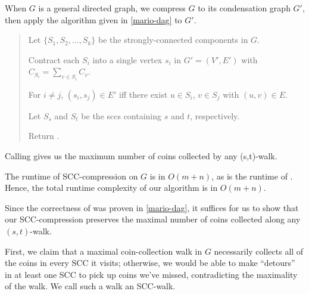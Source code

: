 \documentclass{article}
\begin{document}
\begin{solution}
When \( G \) is a general directed graph, we compress \( G \) to its condensation graph \( G' \), then apply the algorithm given in \ref{mario-dag} to \( G' \).

\begin{quote}%



\begin{steps}
    \item Let \( \{S_1, S_2, ..., S_k\} \) be the strongly-connected components in \( G \).
    \item Contract each \( S_i \) into a single vertex \( s_i \) in \( G' = (V', E') \) with \( C_{S_i} = \sum_{ v\in S_i} C_v \).
    \item For \( i \not= j \), \( (s_i, s_j) \in E' \) iff there exist \( u \in S_i \), \( v \in S_j \) with \( (u,v) \in E \).
    \item Let \( S_s \) and \( S_t \) be the sccs containing \( s \) and \( t \), respectively.
    \item Return .
\end{steps}
\end{quote}

Calling  gives us the maximum number of coins collected by any (s,t)-walk.


\begin{subproof}[Runtime]
The runtime of SCC-compression on \( G \) is in \( O(m+n) \), as is the runtime of . Hence, the total runtime complexity of our algorithm is in \( O(m+n) \).
\end{subproof}


\begin{subproof}[Correctness]
Since the correctness of  was proven in \ref{mario-dag}, it suffices for us to show that our SCC-compression preserves the maximal number of coins collected along any \( (s,t) \)-walk.

First, we claim that a maximal coin-collection walk in \( G \) necessarily collects all of the coins in every SCC it visits; otherwise, we would be able to make ``detours'' in at least one SCC to pick up coins we've missed, contradicting the maximality of the walk. We call such a walk an SCC-walk.


\end{subproof}
\end{solution}
\end{document}
